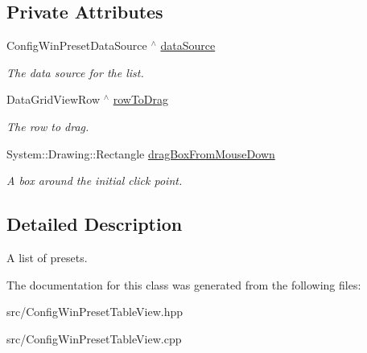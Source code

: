 \subsection*{Private Attributes}
\begin{DoxyCompactItemize}
\item 
\mbox{\label{classConfigWinPresetTableView_ad49a364287a1809859d1b6b62a40ca93}} 
Config\+Win\+Preset\+Data\+Source $^\wedge$ \hyperlink{classConfigWinPresetTableView_ad49a364287a1809859d1b6b62a40ca93}{data\+Source}
\begin{DoxyCompactList}\small\item\em The data source for the list. \end{DoxyCompactList}\item 
\mbox{\label{classConfigWinPresetTableView_a773fceaf2e0a1986710eec5ea0e607a4}} 
Data\+Grid\+View\+Row $^\wedge$ \hyperlink{classConfigWinPresetTableView_a773fceaf2e0a1986710eec5ea0e607a4}{row\+To\+Drag}
\begin{DoxyCompactList}\small\item\em The row to drag. \end{DoxyCompactList}\item 
\mbox{\label{classConfigWinPresetTableView_aaf3fd800981c4994253f0f7adb2c1581}} 
System\+::\+Drawing\+::\+Rectangle \hyperlink{classConfigWinPresetTableView_aaf3fd800981c4994253f0f7adb2c1581}{drag\+Box\+From\+Mouse\+Down}
\begin{DoxyCompactList}\small\item\em A box around the initial click point. \end{DoxyCompactList}\end{DoxyCompactItemize}


\subsection{Detailed Description}
A list of presets. 

The documentation for this class was generated from the following files\+:\begin{DoxyCompactItemize}
\item 
src/Config\+Win\+Preset\+Table\+View.\+hpp\item 
src/Config\+Win\+Preset\+Table\+View.\+cpp\end{DoxyCompactItemize}
